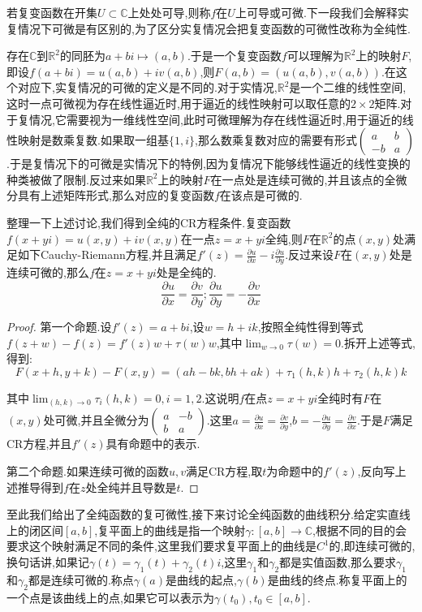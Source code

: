 若复变函数在开集$U\subset\mathbb{C}$上处处可导,则称$f$在$U$上可导或可微.下一段我们会解释实复情况下可微是有区别的,为了区分实复情况会把复变函数的可微性改称为全纯性.

存在$\mathbb{C}$到$\mathbb{R}^2$的同胚为$a+bi\mapsto(a,b)$.于是一个复变函数$f$可以理解为$\mathbb{R}^2$上的映射$F$,即设$f(a+bi)=u(a,b)+iv(a,b)$,则$F(a,b)=(u(a,b),v(a,b))$.在这个对应下,实复情况的可微的定义是不同的.对于实情况,$\mathbb{R}^2$是一个二维的线性空间,这时一点可微视为存在线性逼近时,用于逼近的线性映射可以取任意的$2\times2$矩阵.对于复情况,它需要视为一维线性空间,此时可微理解为存在线性逼近时,用于逼近的线性映射是数乘复数.如果取一组基$\{1,i\}$,那么数乘复数对应的需要有形式$\left(\begin{array}{cc}a&b\\ -b&a\end{array}\right)$.于是复情况下的可微是实情况下的特例,因为复情况下能够线性逼近的线性变换的种类被做了限制.反过来如果$\mathbb{R}^2$上的映射$F$在一点处是连续可微的,并且该点的全微分具有上述矩阵形式,那么对应的复变函数$f$在该点是可微的.

整理一下上述讨论,我们得到全纯的CR方程条件.复变函数$f(x+yi)=u(x,y)+iv(x,y)$在一点$z=x+yi$全纯,则$F$在$\mathbb{R}^2$的点$(x,y)$处满足如下Cauchy-Riemann方程,并且满足$f'(z)=\frac{\partial u}{\partial x}-i\frac{\partial u}{\partial y}$.反过来设$F$在$(x,y)$处是连续可微的,那么$f$在$z=x+yi$处是全纯的.
$$\frac{\partial u}{\partial x}=\frac{\partial v}{\partial y};\frac{\partial u}{\partial y}=-\frac{\partial v}{\partial x}$$
\begin{proof}
	
	第一个命题.设$f'(z)=a+bi$,设$w=h+ik$,按照全纯性得到等式$f(z+w)-f(z)=f'(z)w+\tau(w)w$,其中$\lim_{w\to0}\tau(w)=0$.拆开上述等式,得到:
	$$F(x+h,y+k)-F(x,y)=(ah-bk,bh+ak)+\tau_1(h,k)h+\tau_2(h,k)k$$
	
	其中$\lim_{(h,k)\to0}\tau_i(h,k)=0,i=1,2$.这说明$f$在点$z=x+yi$全纯时有$F$在$(x,y)$处可微,并且全微分为$\left(\begin{array}{cc}a&-b\\ b&a\end{array}\right)$.这里$a=\frac{\partial u}{\partial x}=\frac{\partial v}{\partial y}$,$b=-\frac{\partial u}{\partial y}=\frac{\partial v}{\partial x}$.于是$F$满足CR方程,并且$f'(z)$具有命题中的表示.
	
	第二个命题.如果连续可微的函数$u,v$满足CR方程,取$t$为命题中的$f'(z)$,反向写上述推导得到$f$在$z$处全纯并且导数是$t$.
\end{proof}

至此我们给出了全纯函数的复可微性,接下来讨论全纯函数的曲线积分.给定实直线上的闭区间$[a,b]$,复平面上的曲线是指一个映射$\gamma:[a,b]\to\mathbb{C}$,根据不同的目的会要求这个映射满足不同的条件,这里我们要求复平面上的曲线是$C^1$的,即连续可微的,换句话讲,如果记$\gamma(t)=\gamma_1(t)+\gamma_2(t)i$,这里$\gamma_1$和$\gamma_2$都是实值函数,那么要求$\gamma_1$和$\gamma_2$都是连续可微的.称点$\gamma(a)$是曲线的起点,$\gamma(b)$是曲线的终点.称复平面上的一个点是该曲线上的点,如果它可以表示为$\gamma(t_0),t_0\in[a,b]$.

